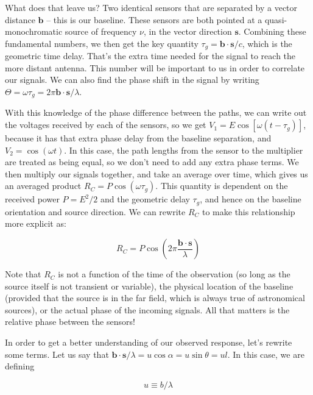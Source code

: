 What does that leave us? Two identical sensors that are separated by a vector 
distance $\mathbf{b}$ -- this is our baseline. These sensors are both pointed 
at a quasi-monochromatic source of frequency $\nu$, in the vector direction 
$\mathbf{s}$.  Combining these fundamental numbers, we then get the key 
quantity $\tau_g = \mathbf{b} \cdot \mathbf{s} / c$, which is the geometric 
time delay. That's the extra time needed for the signal to reach the more 
distant antenna. This number will be important to us in order to correlate our 
signals.  We can also find the phase shift in the signal by writing $\Theta = 
\omega \tau_g = 2 \pi \mathbf{b} \cdot \mathbf{s} / \lambda$.

With this knowledge of the phase difference between the paths, we can write out 
the voltages received by each of the sensors, so we get $V_1 = E \cos{[\omega(t 
- \tau_g)]}$, because it has that extra phase delay from the baseline 
separation, and $V_2 = \cos{(\omega t)}$. In this case, the path lengths from 
the sensor to the multiplier are treated as being equal, so we don't need to 
add any extra phase terms. We then multiply our signals together, and take an 
average over time, which gives us an averaged product $R_C = P \cos{(\omega 
\tau_g)}$. This quantity is dependent on the received power $P = E^2/2$ and the 
geometric delay $\tau_g$, and hence on the baseline orientation and source 
direction. We can rewrite $R_C$ to make this relationship more explicit as:

\begin{equation}
    R_C = P \cos{(2 \pi \frac{\mathbf{b} \cdot \mathbf{s}}{\lambda})}
    \label{eq:R_C}
\end{equation}

Note that $R_C$ is not a function of the time of the observation (so long as 
the source itself is not transient or variable), the physical location of the 
baseline (provided that the source is in the far field, which is always true of 
astronomical sources), or the actual phase of the incoming signals.  All that 
matters is the relative phase between the sensors!

In order to get a better understanding of our observed response, let's rewrite 
some terms. Let us say that $\mathbf{b} \cdot \mathbf{s}/\lambda = 
u\cos{\alpha} = u\sin{\theta} = ul$. In this case, we are defining 

\begin{equation}
    u \equiv b/\lambda
    \label{eq:u}
\end{equation}

